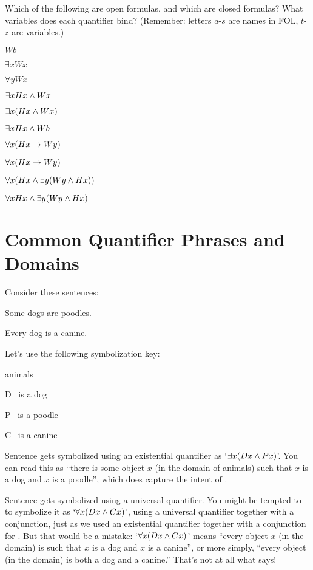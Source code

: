 \problempart Which of the following are open formulas, and which are closed formulas?  What variables does each quantifier bind? (Remember: letters $a$-$s$ are names in FOL, $t$-$z$ are variables.)

\begin{earg}
\item $Wb$
\item $\exists x Wx$
\item $\forall yWx$
\item $\exists xHx \wedge  Wx$
\item $\exists x(Hx \wedge  Wx)$
\item $\exists x Hx \wedge  Wb$
\item $\forall x(Hx \rightarrow Wy)$
\item $\forall x(Hx \rightarrow Wy)$
\item $\forall x(Hx \wedge \exists y(Wy \wedge Hx))$
\item $\forall xHx \wedge \exists y(Wy \wedge Hx)$
\end{earg}


\section{Common Quantifier Phrases and Domains}\label{s:QuantifierPhrases}
Consider these sentences:
	\begin{earg}
		\item[\ex{quan2}] Some dogs are poodles.
		\item[\ex{quan1}] Every dog is a canine.
	\end{earg}
Let's use the following symbolization key:
	\begin{ekey}
		\item[\text{Domain}] animals
		\item[D] \blank\ is a dog
		\item[P] \blank\ is  a poodle
		\item[C] \blank\ is a canine
	\end{ekey}
Sentence  gets symbolized using an existential quantifier as `$\exists x(Dx \wedge Px)$'.  You can read this as ``there is some object $x$ (in the domain of animals) such that $x$ is a dog and $x$ is a poodle'', which does capture the intent of .

Sentence  gets symbolized using a universal quantifier.  You might be tempted to to symbolize it as `$\forall x(Dx \wedge Cx)$', using a universal quantifier together with a conjunction, just as we used an existential quantifier together with a conjunction for .  But that would be a mistake: `$\forall x(Dx \wedge Cx)$' means ``every object $x$ (in the domain) is such that $x$ is a dog and $x$ is a canine'', or more simply, ``every object (in the domain) is both a dog and a canine.''  That's not at all what  says!

